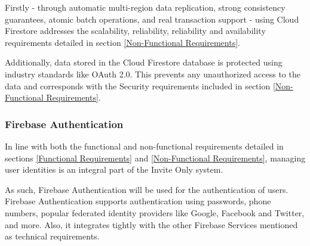 Firstly - through automatic multi-region data replication, strong consistency guarantees, atomic batch operations, and real transaction support - using Cloud Firestore addresses the scalability, reliability, reliability and availability requirements detailed in section \ref{Non-Functional Requirements}.

Additionally, data stored in the Cloud Firestore database is protected using industry standards like OAuth 2.0. This prevents  any unauthorized access to the data and corresponds with the Security requirements included in section \ref{Non-Functional Requirements}.

\subsubsection{Firebase Authentication}

In line with both the functional and non-functional requirements detailed in sections \ref{Functional Requirements} and \ref{Non-Functional Requirements}, managing user identities is an integral part of the Invite Only system.

As such, Firebase Authentication will be used for the authentication of users. Firebase Authentication supports authentication using passwords, phone numbers, popular federated identity providers like Google, Facebook and Twitter, and more. Also, it integrates tightly with the other Firebase Services mentioned as technical requirements.